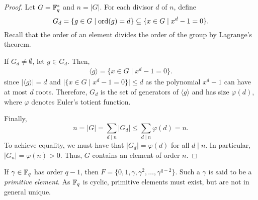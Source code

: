 \documentclass[../main.tex]{subfiles}
\begin{document}
\begin{proof}
Let $G = \mathbb{F}_q^*$ and $n = \lvert G \rvert$. For each divisor $d$ of $n$, define
\begin{equation*}
    G_d = \{ g \in G \mid \operatorname{ord}(g) = d \} \subseteq \{x \in G \mid x^d - 1 = 0 \}.
\end{equation*}
Recall that the order of an element divides the order of the group by Lagrange's theorem.

If $G_d \neq \emptyset$, let $g \in G_d$. Then,
\begin{align*}
    \langle g \rangle = \{x \in G \mid x^d - 1 = 0 \}.
\end{align*}
since $\lvert \langle g \rangle \rvert = d$ and $\lvert \{x \in G \mid x^d - 1 = 0\} \rvert \leq d$ as the polynomial $x^d - 1$ can have at most $d$ roots. Therefore, $G_d$ is the set of generators of $\langle g \rangle$ and has size $\varphi(d)$, where $\varphi$ denotes Euler's totient function.

Finally,
\begin{equation*}
    n = \lvert G \rvert = \sum_{d \mid n} \lvert G_d \rvert \leq \sum_{d \mid n} \varphi(d) = n.
\end{equation*}
To achieve equality, we must have that $\lvert G_d \rvert = \varphi(d)$ for all $d \mid n$. In particular, $\lvert G_n \rvert = \varphi(n) > 0$. Thus, $G$ contains an element of order $n$.
\end{proof}

If $\gamma \in \mathbb{F}_q$ has order $q - 1$, then $F = \{0, 1, \gamma, \gamma^2, \dots, \gamma^{q - 2}\}$. Such a $\gamma$ is said to be a \emph{primitive element}. As $\mathbb{F}_q$ is cyclic, primitive elements must exist, but are not in general unique.
\end{document}
